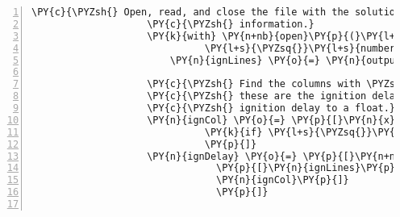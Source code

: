 \begin{Verbatim}[commandchars=\\\{\},fontsize=\small,numbers=left,firstnumber=1,stepnumber=2,firstline=2]
                    \PY{c}{\PYZsh{} Open, read, and close the file with the solution}
                    \PY{c}{\PYZsh{} information.}
                    \PY{k}{with} \PY{n+nb}{open}\PY{p}{(}\PY{l+s}{\PYZsq{}}\PY{l+s}{CKSoln\PYZus{}solution\PYZus{}point\PYZus{}value\PYZus{}vs\PYZus{}solution\PYZus{}}\PY{l+s}{\PYZsq{}}
                              \PY{l+s}{\PYZsq{}}\PY{l+s}{number.csv}\PY{l+s}{\PYZsq{}}\PY{p}{,} \PY{l+s}{\PYZsq{}}\PY{l+s}{r}\PY{l+s}{\PYZsq{}}\PY{p}{)} \PY{k}{as} \PY{n}{outputFile}\PY{p}{:}
                        \PY{n}{ignLines} \PY{o}{=} \PY{n}{outputFile}\PY{o}{.}\PY{n}{readlines}\PY{p}{(}\PY{p}{)}

                    \PY{c}{\PYZsh{} Find the columns with \PYZsq{}Ignition\PYZsq{} in the title \PYZhy{}}
                    \PY{c}{\PYZsh{} these are the ignition delays. Then, convert the}
                    \PY{c}{\PYZsh{} ignition delay to a float.}
                    \PY{n}{ignCol} \PY{o}{=} \PY{p}{[}\PY{n}{x} \PY{k}{for} \PY{n}{x}\PY{p}{,}\PY{n}{val} \PY{o+ow}{in} \PY{n+nb}{enumerate}\PY{p}{(}\PY{n}{ignLines}\PY{p}{[}\PY{l+m+mi}{0}\PY{p}{]}\PY{o}{.}\PY{n}{split}\PY{p}{(}\PY{l+s}{\PYZsq{}}\PY{l+s}{,}\PY{l+s}{\PYZsq{}}\PY{p}{)}\PY{p}{)}
                              \PY{k}{if} \PY{l+s}{\PYZsq{}}\PY{l+s}{Ignition}\PY{l+s}{\PYZsq{}} \PY{o+ow}{in} \PY{n}{val}
                              \PY{p}{]}
                    \PY{n}{ignDelay} \PY{o}{=} \PY{p}{[}\PY{n+nb}{float}\PY{p}{(}\PY{n}{k}\PY{p}{)} \PY{k}{for} \PY{n}{k} \PY{o+ow}{in}
                                \PY{p}{[}\PY{n}{ignLines}\PY{p}{[}\PY{l+m+mi}{1}\PY{p}{]}\PY{o}{.}\PY{n}{split}\PY{p}{(}\PY{l+s}{\PYZsq{}}\PY{l+s}{,}\PY{l+s}{\PYZsq{}}\PY{p}{)}\PY{p}{[}\PY{n}{x}\PY{p}{]}\PY{o}{.}\PY{n}{strip}\PY{p}{(}\PY{p}{)} \PY{k}{for} \PY{n}{x} \PY{o+ow}{in}
                                \PY{n}{ignCol}\PY{p}{]}
                                \PY{p}{]}


\end{Verbatim}
